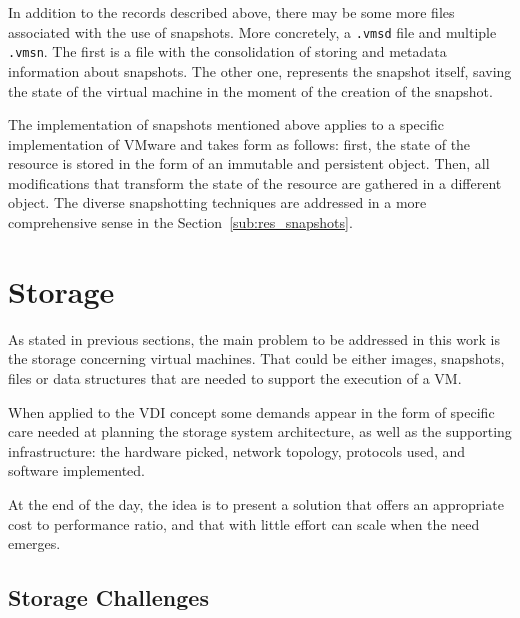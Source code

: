 In addition to the records described above, there may be some more files associated with the use of snapshots. More concretely, a \texttt{.vmsd} file and multiple \texttt{.vmsn}. The first is a file with the consolidation of storing and metadata information about snapshots. The other one, represents the snapshot itself, saving the state of the virtual machine in the moment of the creation of the snapshot.

The implementation of snapshots mentioned above applies to a specific implementation of VMware and takes form as follows: first, the state of the resource is stored in the form of an immutable and persistent object. Then, all modifications that transform the state of the resource are gathered in a different object. 
The diverse snapshotting techniques are addressed in a more comprehensive sense in the Section~\ref{sub:res_snapshots}.


\section{Storage} %
\label{sec:res_storage}

As stated in previous sections, the main problem to be addressed in this work is the storage concerning virtual machines. That could be either images, snapshots, files or data structures that are needed to support the execution of a VM. 

When applied to the VDI concept some demands appear in the form of specific care needed at planning the storage system architecture, as well as the supporting infrastructure: the hardware picked, network topology, protocols used, and software implemented.

At the end of the day, the idea is to present a solution that offers an appropriate cost to performance ratio, and that with little effort can scale when the need emerges.


\subsection{Storage Challenges}
\label{sub:res_storage_challenges}



